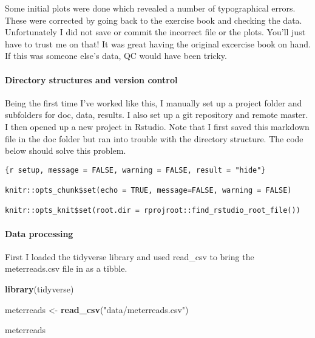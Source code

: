 \documentclass[]{article}
\newenvironment{Shaded}{\begin{snugshade}}{\end{snugshade}}
\newcommand{\KeywordTok}[1]{\textcolor[rgb]{0.13,0.29,0.53}{\textbf{#1}}}
\newcommand{\StringTok}[1]{\textcolor[rgb]{0.31,0.60,0.02}{#1}}
\newcommand{\NormalTok}[1]{#1}
\let\oldparagraph\paragraph
\renewcommand{\paragraph}[1]{\oldparagraph{#1}\mbox{}}
\begin{document}
Some initial plots were done which revealed a number of typographical
errors. These were corrected by going back to the exercise book and
checking the data. Unfortunately I did not save or commit the incorrect
file or the plots. You'll just have to trust me on that! It was great
having the original excercise book on hand. If this was someone else's
data, QC would have been tricky.

\paragraph{Directory structures and version
control}\label{directory-structures-and-version-control}

Being the first time I've worked like this, I manually set up a project
folder and subfolders for doc, data, results. I also set up a git
repository and remote master. I then opened up a new project in Rstudio.
Note that I first saved this markdown file in the doc folder but ran
into trouble with the directory structure. The code below should solve
this problem.

\begin{verbatim}
{r setup, message = FALSE, warning = FALSE, result = "hide"}

knitr::opts_chunk$set(echo = TRUE, message=FALSE, warning = FALSE)

knitr::opts_knit$set(root.dir = rprojroot::find_rstudio_root_file())
\end{verbatim}

\paragraph{Data processing}\label{data-processing}

First I loaded the tidyverse library and used read\_csv to bring the
meterreads.csv file in as a tibble.

\begin{Shaded}
\begin{Highlighting}[]
\KeywordTok{library}\NormalTok{(tidyverse)}

\NormalTok{meterreads <-}\StringTok{ }\KeywordTok{read_csv}\NormalTok{(}\StringTok{"data/meterreads.csv"}\NormalTok{)}
\end{Highlighting}
\end{Shaded}

\begin{Shaded}
\begin{Highlighting}[]
\NormalTok{meterreads}
\end{Highlighting}
\end{Shaded}
\end{document}
